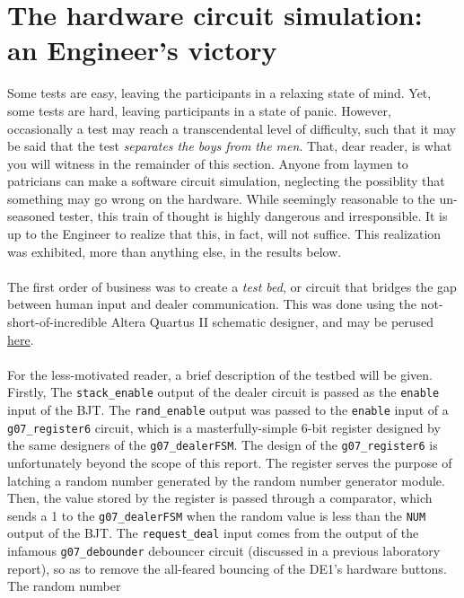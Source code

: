 \documentclass[12pt]{report}
\begin{document}
\section*{The hardware circuit simulation: an Engineer's victory}
Some tests are easy, leaving the participants in a relaxing state of mind. Yet, some tests are hard,
leaving participants in a state of panic. However, occasionally a test may reach a transcendental level of
difficulty, such that it may be said that the test \textit{separates the boys from the men}. That,
dear reader, is what you will witness in the remainder of this section. Anyone from laymen to
patricians can make a software circuit simulation, neglecting the possiblity that something may go
wrong on the hardware. While seemingly reasonable to the un-seasoned tester, this train of thought
is highly dangerous and irresponsible. It is up to the Engineer to realize that this, in fact, will
not suffice. This realization was exhibited, more than anything else, in the results below. \\\\
The first order of business was to create a \textit{test bed}, or circuit that bridges the gap
between human input and dealer communication. This was done using the not-short-of-incredible Altera
Quartus II schematic designer, and may be perused \hyperref[a:testbed]{here}.\\\\
For the less-motivated reader, a brief description of the testbed will be given. Firstly, The
\texttt{stack\_enable} output of the dealer circuit is passed as the \texttt{enable} input of the
BJT. The \texttt{rand\_enable} output was passed to the \texttt{enable} input of a
\texttt{g07\_register6} circuit, which is a masterfully-simple 6-bit register designed by the same
designers of the \texttt{g07\_dealerFSM}. The design of the \texttt{g07\_register6} is unfortunately
beyond the scope of this report. The register serves the purpose of latching a random
number generated by the random number generator module. Then, the value stored by the register is
passed through a comparator, which sends a 1 to the \texttt{g07\_dealerFSM} when the random value is
less than the \texttt{NUM} output of the BJT. The \texttt{request\_deal} input comes from the output
of the infamous \texttt{g07\_debounder} debouncer circuit (discussed in a previous laboratory
report), so as to remove the all-feared bouncing of the DE1's hardware buttons. The random number
\end{document}
